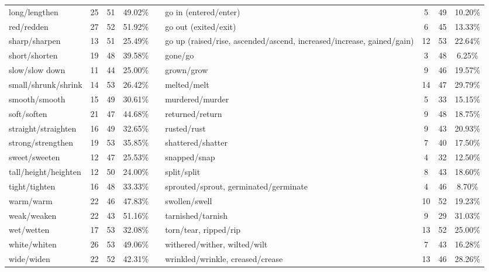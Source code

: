 \begin{tabular}{p{3cm}ccccp{3cm}ccc}
long/lengthen & 25 & 51 & 49.02\% & & go in (entered/enter) & 5 & 49 & 10.20\% \\
red/redden & 27 & 52 & 51.92\% & & go out (exited/exit) & 6 & 45 & 13.33\% \\
sharp/sharpen & 13 & 51 & 25.49\% & & go up (raised/rise, ascended/ascend, increased/increase, gained/gain) & 12 & 53 & 22.64\% \\
short/shorten & 19 & 48 & 39.58\% & & gone/go & 3 & 48 & 6.25\% \\
slow/slow down & 11 & 44 & 25.00\% & & grown/grow & 9 & 46 & 19.57\% \\
small/shrunk/shrink & 14 & 53 & 26.42\% & & melted/melt & 14 & 47 & 29.79\% \\
smooth/smooth & 15 & 49 & 30.61\% & & murdered/murder & 5 & 33 & 15.15\% \\
soft/soften & 21 & 47 & 44.68\% & & returned/return & 9 & 48 & 18.75\% \\
straight/straighten & 16 & 49 & 32.65\% & & rusted/rust & 9 & 43 & 20.93\% \\
strong/strengthen & 19 & 53 & 35.85\% & & shattered/shatter & 7 & 40 & 17.50\% \\
sweet/sweeten & 12 & 47 & 25.53\% & & snapped/snap & 4 & 32 & 12.50\% \\
tall/height/heighten & 12 & 50 & 24.00\% & & split/split & 8 & 43 & 18.60\% \\
tight/tighten & 16 & 48 & 33.33\% & & sprouted/sprout, germinated/germinate & 4 & 46 & 8.70\% \\
warm/warm & 22 & 46 & 47.83\% & & swollen/swell & 10 & 52 & 19.23\% \\
weak/weaken & 22 & 43 & 51.16\% & & tarnished/tarnish & 9 & 29 & 31.03\% \\
wet/wetten & 17 & 53 & 32.08\% & & torn/tear, ripped/rip & 13 & 52 & 25.00\% \\
white/whiten & 26 & 53 & 49.06\% & & withered/wither, wilted/wilt & 7 & 43 & 16.28\% \\
wide/widen & 22 & 52 & 42.31\% & & wrinkled/wrinkle, creased/crease & 13 & 46 & 28.26\%
\end{tabular}